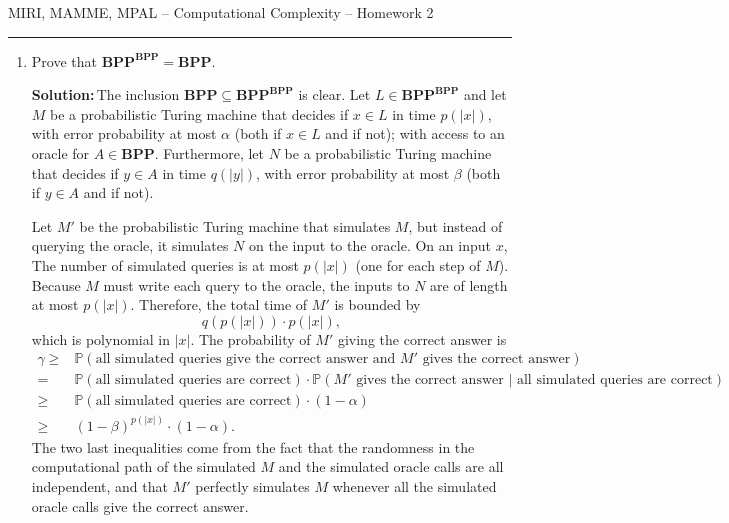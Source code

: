 \documentclass{amsart}
\theoremstyle{plain}
\theoremstyle{definition}
\newcommand{\bpp}{\textbf{BPP}}
\newcommand{\sol}{\textbf{Solution:\,}}
\begin{document}
    {\Large MIRI, MAMME, MPAL -- Computational Complexity -- Homework 2}

    \vspace{0.5cm}

    \hrule

    \vspace{0.5cm}

    \begin{enumerate}[label=\textbf{Exercise \arabic*:}, leftmargin=0cm, labelwidth=-0.2cm, align=left]

        \item Prove that $\bpp^{\bpp} = \bpp$.

            \sol The inclusion $\bpp \subseteq \bpp^{\bpp}$ is clear.
            Let $L \in \bpp^{\bpp}$ and let $M$ be a probabilistic Turing machine
            that decides if $x \in L$
            in time $p(|x|)$, with error probability at most $\alpha$
            (both if $x \in L$ and if not);
            with access to an oracle for
            $A \in \bpp$.
            Furthermore, let $N$ be a probabilistic Turing machine that decides if $y \in A$
            in time $q(|y|)$,
            with error probability at most $\beta$
            (both if $y \in A$ and if not).

            Let $M'$ be the probabilistic Turing machine that simulates $M$,
            but instead of querying the oracle, it simulates $N$ on the input
            to the oracle.
            On an input $x$,
            The number of simulated queries is at most $p(|x|)$
            (one for each step of $M$).
            Because $M$ must write each query to the oracle,
            the inputs to $N$ are of length at most $p(|x|)$.
            Therefore, the total time of $M'$ is bounded by
            \[
               q(p(|x|)) \cdot p(|x|),
            \]
            which is polynomial in $|x|$.
            The probability of $M'$ giving the correct answer is
            \begin{align*}
                \gamma \geq & \mathbb{P}(\text{all simulated queries give the correct answer and } M' \text{ gives the correct answer}) \\
                = & \mathbb{P}(\text{all simulated queries are correct}) \cdot \mathbb{P}(M' \text{ gives the correct answer } | \text{ all simulated queries are correct}) \\
                \geq & \mathbb{P}(\text{all simulated queries are correct}) \cdot (1 - \alpha) \\
                \geq & (1 - \beta)^{p(|x|)} \cdot (1 - \alpha).
            \end{align*}
            The two last inequalities come from the fact that the randomness in the computational path
            of the simulated $M$ and the simulated oracle calls are all independent, and that
            $M'$ perfectly simulates $M$ whenever all the simulated oracle calls give the correct answer.


\end{enumerate}
\end{document}
